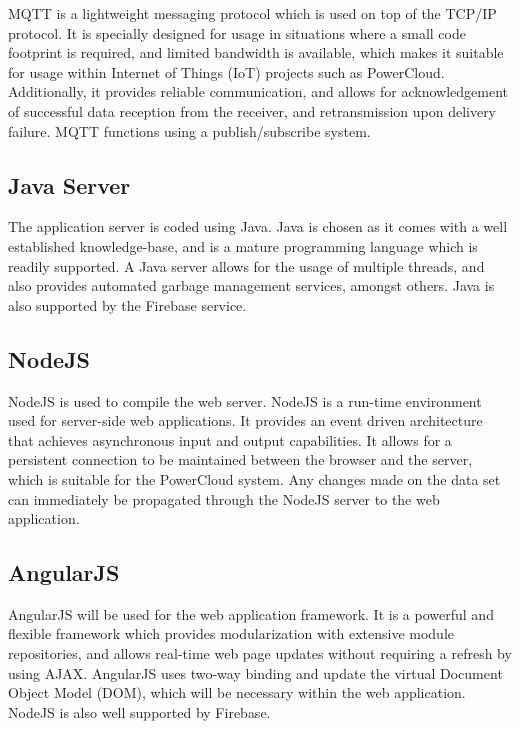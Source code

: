 \documentclass{article}
\begin{document}
	MQTT is a lightweight messaging protocol which is used on top of the 
	TCP/IP protocol. It is specially designed for usage in situations 
	where a small code footprint is required, and limited bandwidth is 
	available, which makes it suitable for usage within Internet of 
	Things (IoT) projects such as PowerCloud. Additionally, it provides 
	reliable communication, and allows for acknowledgement of successful 
	data reception from the receiver, and retransmission upon delivery 
	failure. MQTT functions using a publish/subscribe system.
	
	\subsection{Java Server}
	
	The application server is coded using Java. Java is chosen as it 
	comes with a well established knowledge-base, and is a mature 
	programming language which is readily supported. A Java server allows 
	for the usage of multiple threads, and also provides automated 
	garbage management services, amongst others. Java is also supported 
	by the Firebase service.
	
	\subsection{NodeJS}
	
	NodeJS is used to compile the web server. NodeJS is a run-time 
	environment used for server-side web applications. It provides an 
	event driven architecture that achieves asynchronous input and output 
	capabilities. It allows for a  persistent connection to be maintained 
	between the browser and the server, which is suitable for the 
	PowerCloud system. Any changes made on the data set can immediately 
	be propagated through the NodeJS server to the web application.
	
	\subsection{AngularJS}
	
	AngularJS will be used for the web application framework. It is a 
	powerful and flexible framework which provides modularization with 
	extensive module repositories, and allows real-time web page updates 
	without requiring a refresh by using AJAX. AngularJS uses two-way 
	binding and update the virtual Document Object Model (DOM), which 
	will be necessary within the web application. NodeJS is also well 
	supported by Firebase.
	
\end{document}
